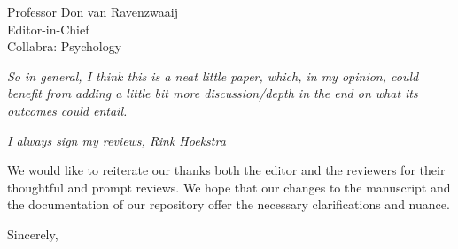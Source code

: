 \documentclass{stanfordletter}
\newcommand{\theysaid}[1]{\begin{leftbar} \noindent 
		\textsl{ #1}\end{leftbar}}
\begin{document}
\begin{letter}{Professor Don van Ravenzwaaij \\ Editor-in-Chief \\ Collabra: Psychology }
		 
		\theysaid{So in general, I think this is a neat little paper, which, in my opinion, could benefit from adding a little bit more discussion/depth in the end on what its outcomes could entail.}
		
		\theysaid{I always sign my reviews,
		Rink Hoekstra}
		
		We would like to reiterate our thanks both the editor and the reviewers for their thoughtful and prompt reviews. We hope that our changes to the manuscript and the documentation of our repository offer the necessary clarifications and nuance. 
		
		
          
          \closing{Sincerely,}
	\end{letter}
	
\end{document}
